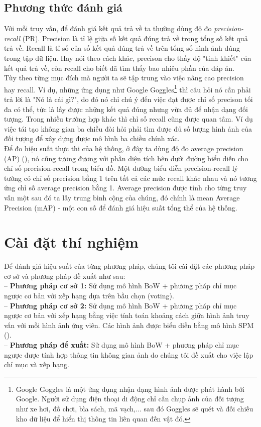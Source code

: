 \subsection{Phương thức đánh giá}
\label{evaluation}
Với mỗi truy vấn, để đánh giá kết quả trả về ta thường dùng độ đo \textit{precision-recall} (PR). Precision là tỉ lệ giữa số kết quả đúng trả về trong tổng số kết quả trả về. Recall là tỉ số của số kết quả đúng trả về trên tổng số hình ảnh đúng trong tập dữ liệu. Hay nói theo cách khác, precison cho thấy độ "tinh khiết" của kết quả trả về, còn recall cho biết đã tìm thấy bao nhiêu phần của đáp án.\\
Tùy theo từng mục đích mà người ta sẽ tập trung vào việc nâng cao precision hay recall. Ví dụ, những ứng dụng như Google Goggles\footnote{Google Goggles là một ứng dụng nhận dạng hình ảnh được phát hành bởi Google. Người sử dụng điện thoại di động chỉ cần chụp ảnh của đối tượng như xe hơi, đồ chơi, bìa sách, mã vạch,... sau đó Goggles sẽ quét và đối chiếu kho dữ liệu để hiển thị thông tin liên quan đến vật đó.} thì câu hỏi nó cần phải trả lời là "Nó là cái gì?", do đó nó chỉ chú ý đến việc đạt được chỉ số precison tối đa có thể, tức là lấy được những kết quả đúng nhưng vừa đủ để nhận dạng đối tượng. Trong nhiều trường hợp khác thì chỉ số recall cũng được quan tâm. Ví dụ việc tái tạo không gian ba chiều đòi hỏi phải tìm được đủ số lượng hình ảnh của đối tượng để xây dựng được mô hình ba chiều chính xác.\\
Để đo hiệu suất thực thi của hệ thống, ở đây ta dùng độ đo average precision (AP) (\cite{philbin2007object}), nó cũng tương đương với phần diện tích bên dưới đường biểu diễn cho chỉ số precision-recall trong biểu đồ. Một đường biểu diễn precision-recall lý tưởng có chỉ số precision bằng 1 trên tất cả các mức recall khác nhau và nó tương ứng chỉ số average precision bằng 1. Average precision được tính cho từng truy vấn một sau đó ta lấy trung bình cộng của chúng, đó chính là mean Average Precision (mAP) - một con số để đánh giá hiệu suất tổng thể của hệ thống.

\section{Cài đặt thí nghiệm}
\label{experimental-setting}
Để đánh giá hiệu suất của từng phương pháp, chúng tôi cài đặt các phương pháp cơ sở và phương pháp đề xuất như sau:\\
-- \textbf{Phương pháp cơ sở 1:} Sử dụng mô hình BoW + phương pháp chỉ mục ngược cơ bản với xếp hạng dựa trên bầu chọn (voting).\\
-- \textbf{Phương pháp cơ sở 2:} Sử dụng mô hình BoW + phương pháp chỉ mục ngược cơ bản với xếp hạng bằng việc tính toán khoảng cách giữa hình ảnh truy vấn với mỗi hình ảnh ứng viên. Các hình ảnh được biểu diễn bằng mô hình SPM (\cite{lazebnik2006beyond}).\\
-- \textbf{Phương pháp để xuất:} Sử dụng mô hình BoW + phương pháp chỉ mục ngược được tính hợp thông tin không gian ảnh do chúng tôi đề xuất cho việc lập chỉ mục và xếp hạng.

